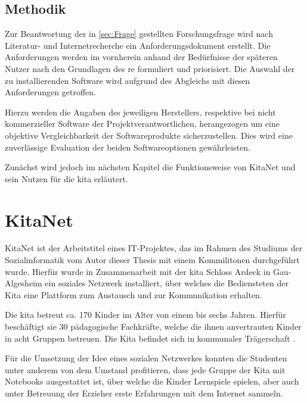 \section{Methodik}

Zur Beantwortung der in \autoref{sec:Frage} gestellten Forschungsfrage wird nach Literatur- und Internetrecherche ein Anforderungsdokument erstellt. Die Anforderungen werden im vornherein anhand der Bedürfnisse der späteren Nutzer nach den Grundlagen des \ac{re} formuliert und priorisiert.
Die Auswahl der zu installierenden Software wird aufgrund des Abgleichs mit diesen Anforderungen getroffen.

Hierzu werden die Angaben des jeweiligen Herstellers, respektive bei nicht kommerzieller Software der Projektverantwortlichen, herangezogen um eine objektive Vergleichbarkeit der Softwareprodukte sicherzustellen.
Dies wird eine zuverlässige Evaluation der beiden Softwareoptionen gewährleisten. 

Zunächst wird jedoch im nächsten Kapitel die Funktionsweise von KitaNet und sein Nutzen für die \ac{kita} erläutert.

\chapter{KitaNet}
\label{sec:KitaNet}

KitaNet ist der Arbeitstitel eines IT-Projektes, das im Rahmen des Studiums der Sozialinformatik vom Autor dieser Thesis mit einem Kommilitonen durchgeführt wurde. Hierfür wurde in Zusammenarbeit mit der \ac{kita} Schloss Ardeck in Gau-Algesheim ein soziales Netzwerk installiert, über welches die Bediensteten der Kita eine Plattform zum Austausch und zur Kommunikation erhalten. 

Die \ac{kita} betreut ca. 170 Kinder im Alter von einem bis sechs Jahren. Hierfür beschäftigt sie 30 pädagogische Fachkräfte, welche die ihnen anvertrauten Kinder in acht Gruppen betreuen. Die Kita befindet sich in kommunaler Trägerschaft \citep[vgl.][]{kitaweb}.

Für die Umsetzung der Idee eines sozialen Netzwerkes konnten die Studenten unter anderem von dem Umstand profitieren, dass jede Gruppe der Kita mit Notebooks ausgestattet ist, über welche die Kinder Lernspiele spielen, aber auch unter Betreuung der Erzieher erste Erfahrungen mit dem Internet sammeln.

